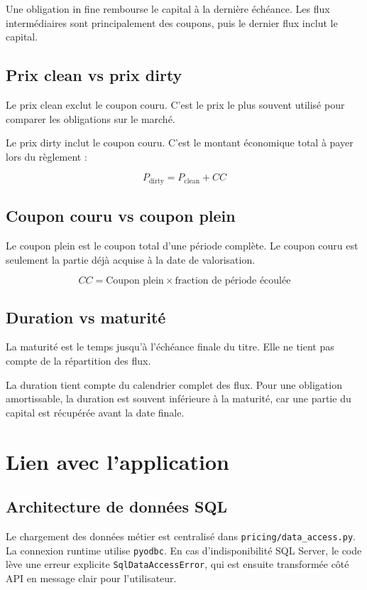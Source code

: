 \documentclass[12pt,a4paper]{article}
\begin{document}
Une obligation in fine rembourse le capital à la dernière échéance. Les flux intermédiaires sont principalement des coupons, puis le dernier flux inclut le capital.

\subsection{Prix clean vs prix dirty}

Le prix clean exclut le coupon couru. C'est le prix le plus souvent utilisé pour comparer les obligations sur le marché.

Le prix dirty inclut le coupon couru. C'est le montant économique total à payer lors du règlement :

\[
P_{\text{dirty}} = P_{\text{clean}} + CC
\]

\subsection{Coupon couru vs coupon plein}

Le coupon plein est le coupon total d'une période complète. Le coupon couru est seulement la partie déjà acquise à la date de valorisation.

\[
CC = \text{Coupon plein} \times \text{fraction de période écoulée}
\]

\subsection{Duration vs maturité}

La maturité est le temps jusqu'à l'échéance finale du titre. Elle ne tient pas compte de la répartition des flux.

La duration tient compte du calendrier complet des flux. Pour une obligation amortissable, la duration est souvent inférieure à la maturité, car une partie du capital est récupérée avant la date finale.

\section{Lien avec l'application}

\subsection{Architecture de données SQL}

Le chargement des données métier est centralisé dans \texttt{pricing/data\_access.py}. La connexion runtime utilise \texttt{pyodbc}. En cas d'indisponibilité SQL Server, le code lève une erreur explicite \texttt{SqlDataAccessError}, qui est ensuite transformée côté API en message clair pour l'utilisateur.
\end{document}

